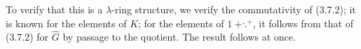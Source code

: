 To verify that this is a \(\lambda\)-ring structure, we verify the commutativity of (3.7.2); it is known for the elements of \(K\); for the elements of \(1+\widehat{\mathord{.}}{}^{+}\), it follows from that of (3.7.2) for \(\widehat G\) by passage to the quotient. The result follows at once.

\providecommand{\Ghat}{\widehat G}
\providecommand{\Aqhat}{\widehat A_{\mathbb Q}}
\providecommand{\Ch}{\operatorname{Ch}}
\providecommand{\Log}{\operatorname{Log}}
\providecommand{\id}{\operatorname{id}}
\providecommand{\gr}{\operatorname{gr}}
\providecommand{\Hom}{\operatorname{Hom}}
\providecommand{\epsi}{\varepsilon}
\providecommand{\clgr}{\operatorname{cl}}
\providecommand{\Fil}{\operatorname{Fil}}
\providecommand{\Gr}{\operatorname{Gr}}
\providecommand{\Sym}{\operatorname{Sym}}

\providecommand{\Ghat}{\widehat G}
\providecommand{\Aqhat}{\widehat A_{\mathbb Q}}
\providecommand{\Ch}{\operatorname{Ch}}
\providecommand{\Log}{\operatorname{Log}}
\renewcommand{\id}{\operatorname{id}}
\providecommand{\gr}{\operatorname{gr}}
\providecommand{\Hom}{\operatorname{Hom}}
\providecommand{\epsi}{\varepsilon}
\providecommand{\clgr}{\operatorname{cl}}
\providecommand{\Fil}{\operatorname{Fil}}
\providecommand{\Gr}{\operatorname{Gr}}
\providecommand{\Sym}{\operatorname{Sym}}

